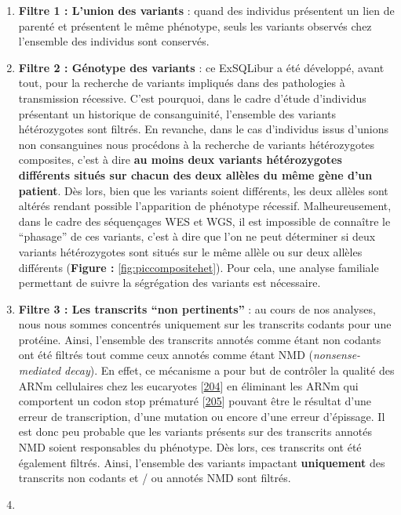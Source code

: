 \documentclass[12pt,a4paper,twoside]{ugathesis}
\theoremstyle{definition}
\theoremstyle{definition}
\theoremstyle{definition}
\theoremstyle{remark}
\begin{document}
\begin{enumerate}
\def\labelenumi{\arabic{enumi}.}
\item
  \textbf{Filtre 1 : L'union des variants} : quand des individus
  présentent un lien de parenté et présentent le même phénotype, seuls
  les variants observés chez l'ensemble des individus sont conservés.
\item
  \textbf{Filtre 2 : Génotype des variants} : ce ExSQLibur a été
  développé, avant tout, pour la recherche de variants impliqués dans
  des pathologies à transmission récessive. C'est pourquoi, dans le
  cadre d'étude d'individus présentant un historique de consanguinité,
  l'ensemble des variants hétérozygotes sont filtrés. En revanche, dans
  le cas d'individus issus d'unions non consanguines nous procédons à la
  recherche de variants hétérozygotes composites, c'est à dire
  \textbf{au moins deux variants hétérozygotes différents situés sur
  chacun des deux allèles du même gène d'un patient}. Dès lors, bien que
  les variants soient différents, les deux allèles sont altérés rendant
  possible l'apparition de phénotype récessif. Malheureusement, dans le
  cadre des séquençages WES et WGS, il est impossible de connaître le
  ``phasage'' de ces variants, c'est à dire que l'on ne peut déterminer
  si deux variants hétérozygotes sont situés sur le même allèle ou sur
  deux allèles différents (\textbf{Figure : }\ref{fig:piccompositehet}).
  Pour cela, une analyse familiale permettant de suivre la ségrégation
  des variants est nécessaire.
\item
  \textbf{Filtre 3 : Les transcrits ``non pertinents''} : au cours de
  nos analyses, nous nous sommes concentrés uniquement sur les
  transcrits codants pour une protéine. Ainsi, l'ensemble des transcrits
  annotés comme étant non codants ont été filtrés tout comme ceux
  annotés comme étant NMD (\emph{nonsense-mediated decay}). En effet, ce
  mécanisme a pour but de contrôler la qualité des ARNm cellulaires chez
  les eucaryotes {[}\protect\hyperlink{ref-Chang2007}{204}{]} en
  éliminant les ARNm qui comportent un codon stop prématuré
  {[}\protect\hyperlink{ref-Baker2004}{205}{]} pouvant être le résultat
  d'une erreur de transcription, d'une mutation ou encore d'une erreur
  d'épissage. Il est donc peu probable que les variants présents sur des
  transcrits annotés NMD soient responsables du phénotype. Dès lors, ces
  transcrits ont été également filtrés. Ainsi, l'ensemble des variants
  impactant \textbf{uniquement} des transcrits non codants et / ou
  annotés NMD sont filtrés.
\item

\end{enumerate}
\end{document}
